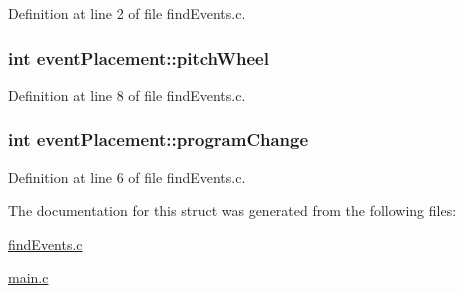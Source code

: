 Definition at line 2 of file find\+Events.\+c.

\hypertarget{structevent_placement_a518dafda61912ec33cc1db88e3e559fa}{
\subsubsection[{pitch\+Wheel}]{\setlength{\rightskip}{0pt plus 5cm}int event\+Placement\+::pitch\+Wheel}}\label{structevent_placement_a518dafda61912ec33cc1db88e3e559fa}


Definition at line 8 of file find\+Events.\+c.

\hypertarget{structevent_placement_a047734cc2a3854a154c3717479cf88b0}{
\subsubsection[{program\+Change}]{\setlength{\rightskip}{0pt plus 5cm}int event\+Placement\+::program\+Change}}\label{structevent_placement_a047734cc2a3854a154c3717479cf88b0}


Definition at line 6 of file find\+Events.\+c.



The documentation for this struct was generated from the following files\+:\begin{DoxyCompactItemize}
\item 
\hyperlink{find_events_8c}{find\+Events.\+c}\item 
\hyperlink{main_8c}{main.\+c}\end{DoxyCompactItemize}
